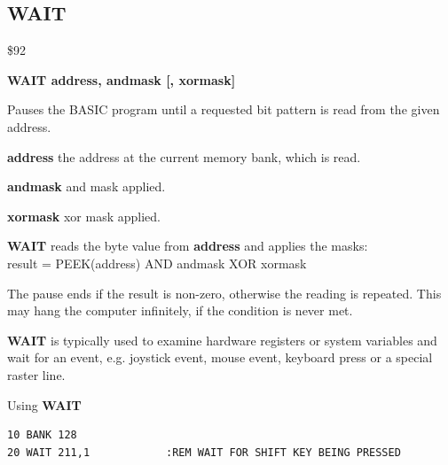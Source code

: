 
\newpage
\subsection{WAIT}
\begin{description}[leftmargin=2cm,style=nextline]
\item [Token:] \$92
\item [Format:] {\bf WAIT address, andmask [, xormask]}
\item [Usage:] Pauses the BASIC program until a requested
               bit pattern is read from the given address.

               {\bf address} the address at the current memory
               bank, which is read.

               {\bf andmask} and mask applied.

               {\bf xormask} xor mask applied.

               {\bf WAIT} reads the byte value from {\bf address}
               and applies the masks: \\
               result = PEEK(address) AND andmask XOR xormask

               The pause ends if the result is non-zero, otherwise
               the reading is repeated. This may hang the computer
               infinitely, if the condition is never met.

\item [Remarks:] {\bf WAIT} is typically used to examine hardware
               registers or system variables
               and wait for an event, e.g. joystick event,
               mouse event, keyboard press or a special raster line.

\item [Example:] Using {\bf WAIT}
\begin{tcolorbox}[colback=black,coltext=white]
\verbatimfont{\codefont}
\begin{verbatim}
10 BANK 128
20 WAIT 211,1            :REM WAIT FOR SHIFT KEY BEING PRESSED
\end{verbatim}
\end{tcolorbox}
\end{description}


\newpage
